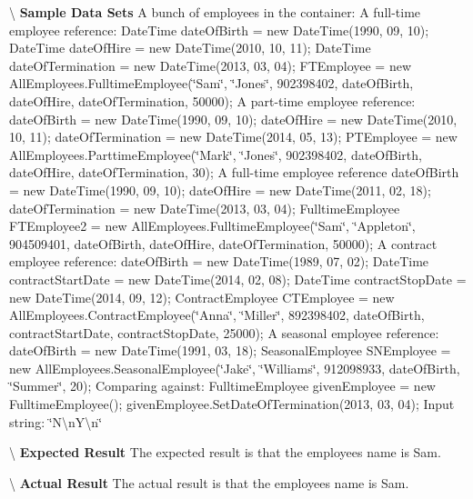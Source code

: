 \textbackslash{} {\bfseries  Sample Data Sets} A bunch of employees in the container\+: A full-\/time employee reference\+: Date\+Time date\+Of\+Birth = new Date\+Time(1990, 09, 10); Date\+Time date\+Of\+Hire = new Date\+Time(2010, 10, 11); Date\+Time date\+Of\+Termination = new Date\+Time(2013, 03, 04); F\+T\+Employee = new All\+Employees.\+Fulltime\+Employee(\char`\"{}\+Sam\char`\"{}, \char`\"{}\+Jones\char`\"{}, 902398402, date\+Of\+Birth, date\+Of\+Hire, date\+Of\+Termination, 50000); A part-\/time employee reference\+: date\+Of\+Birth = new Date\+Time(1990, 09, 10); date\+Of\+Hire = new Date\+Time(2010, 10, 11); date\+Of\+Termination = new Date\+Time(2014, 05, 13); P\+T\+Employee = new All\+Employees.\+Parttime\+Employee(\char`\"{}\+Mark\char`\"{}, \char`\"{}\+Jones\char`\"{}, 902398402, date\+Of\+Birth, date\+Of\+Hire, date\+Of\+Termination, 30); A full-\/time employee reference date\+Of\+Birth = new Date\+Time(1990, 09, 10); date\+Of\+Hire = new Date\+Time(2011, 02, 18); date\+Of\+Termination = new Date\+Time(2013, 03, 04); Fulltime\+Employee F\+T\+Employee2 = new All\+Employees.\+Fulltime\+Employee(\char`\"{}\+Sam\char`\"{}, \char`\"{}\+Appleton\char`\"{}, 904509401, date\+Of\+Birth, date\+Of\+Hire, date\+Of\+Termination, 50000); A contract employee reference\+: date\+Of\+Birth = new Date\+Time(1989, 07, 02); Date\+Time contract\+Start\+Date = new Date\+Time(2014, 02, 08); Date\+Time contract\+Stop\+Date = new Date\+Time(2014, 09, 12); Contract\+Employee C\+T\+Employee = new All\+Employees.\+Contract\+Employee(\char`\"{}\+Anna\char`\"{}, \char`\"{}\+Miller\char`\"{}, 892398402, date\+Of\+Birth, contract\+Start\+Date, contract\+Stop\+Date, 25000); A seasonal employee reference\+: date\+Of\+Birth = new Date\+Time(1991, 03, 18); Seasonal\+Employee S\+N\+Employee = new All\+Employees.\+Seasonal\+Employee(\char`\"{}\+Jake\char`\"{}, \char`\"{}\+Williams\char`\"{}, 912098933, date\+Of\+Birth, \char`\"{}\+Summer\char`\"{}, 20); Comparing against\+: Fulltime\+Employee given\+Employee = new Fulltime\+Employee(); given\+Employee.\+Set\+Date\+Of\+Termination(2013, 03, 04); Input string\+: \char`\"{}\+N\textbackslash{}n\+Y\textbackslash{}n\char`\"{}

\textbackslash{} {\bfseries  Expected Result} The expected result is that the employee\textquotesingle{}s name is Sam.

\textbackslash{} {\bfseries  Actual Result} The actual result is that the employee\textquotesingle{}s name is Sam. \hypertarget{class_the_company_1_1_tests_1_1_select_employee_tests_a4c5d13cc4dd227bc1961cc0284b2a284}{}
